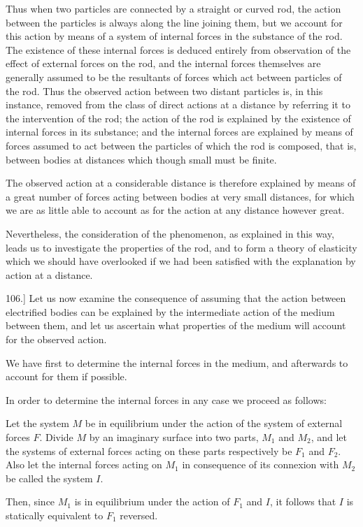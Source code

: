 \documentclass[11pt,a4paper]{article}
\begin{document}
Thus when two particles are connected by a straight or curved rod, the action between the particles is always along the line joining them, but we account for this action by means of a system of internal forces in the substance of the rod. The existence of these internal forces is deduced entirely from observation of the effect of external forces on the rod, and the internal forces themselves are generally assumed to be the resultants of forces which act between particles of the rod. Thus the observed action between two distant particles is, in this instance, removed from the class of direct actions at a distance by referring it to the intervention of the rod; the action of the rod is explained by the existence of internal forces in its substance; and the internal forces are explained by means of forces assumed to act between the particles of which the rod is composed, that is, between bodies at distances which though small must be finite.

The observed action at a considerable distance is therefore explained by means of a great number of forces acting between bodies at very small distances, for which we are as little able to account as for the action at any distance however great.

Nevertheless, the consideration of the phenomenon, as explained in this way, leads us to investigate the properties of the rod, and to form a theory of elasticity which we should have overlooked if we had been satisfied with the explanation by action at a distance.

106.] Let us now examine the consequence of assuming that the action between electrified bodies can be explained by the intermediate action of the medium between them, and let us ascertain what properties of the medium will account for the observed action.

We have first to determine the internal forces in the medium, and afterwards to account for them if possible.

In order to determine the internal forces in any case we proceed as follows:

Let the system $M$ be in equilibrium under the action of the system of external forces $F$. Divide $M$ by an imaginary surface into two parts, $M_1$ and $M_2$, and let the systems of external forces acting on these parts respectively be $F_1$ and $F_2$. Also let the internal forces acting on $M_1$ in consequence of its connexion with $M_2$ be called the system $I$.

Then, since $M_1$ is in equilibrium under the action of $F_1$ and $I$, it follows that $I$ is statically equivalent to $F_1$ reversed.
\end{document}
